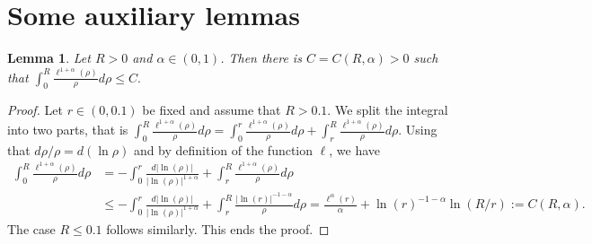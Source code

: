 \documentclass[11 pt]{article}
\newtheorem{lemma}[theorem]{Lemma}
\numberwithin{equation}{section}
\begin{document}
 \appendix

\section{Some auxiliary lemmas}
%
\begin{lemma}\label{lem:over}
Let $R>0$ and $\alpha\in(0,1)$. Then there is $C=C(R,\alpha)>0$ such that $\int_0^{R} \frac{\ell^{1+\alpha}(\rho)}{\rho}d\rho\leq C.$
\end{lemma}
%
\begin{proof}
Let $r\in(0,0.1)$ be fixed and assume that $R>0.1$. We split the integral into two parts, that is $\int_{0}^{R}\frac{\ell^{1+\alpha}(\rho)}{\rho}d\rho=\int_{0}^{r} \frac{\ell^{1+\alpha}(\rho)}{\rho}d\rho + \int_{r}^{R}\frac{\ell^{1+\alpha}(\rho)}{\rho}d\rho.$ Using that $d\rho/\rho=d(\ln \rho)$ and by definition of the function $\ell$, we have
%
\begin{align*}
    \int_{0}^{R}\frac{\ell^{1+\alpha}(\rho)}{\rho}d\rho &=-\int_{0}^{r} \frac{d|\ln(\rho)|}{|\ln(\rho)|^{1+\alpha}} + \int_{r}^{R}\frac{\ell^{1+\alpha}(\rho)}{\rho}d\rho 
    \\ &\leq -\int_{0}^{r} \frac{d|\ln(\rho)|}{|\ln(\rho)|^{1+\alpha}} + \int_{r}^{R}\frac{|\ln(r)|^{-1-\alpha}}{\rho}d\rho=\frac{\ell^\alpha(r)}{\alpha}+\ln(r)^{-1-\alpha}\ln(R/r):=C(R,\alpha).
\end{align*}
%
The case $R\leq 0.1$ follows similarly. This ends the proof. 
\end{proof}
%
%
\end{document}
